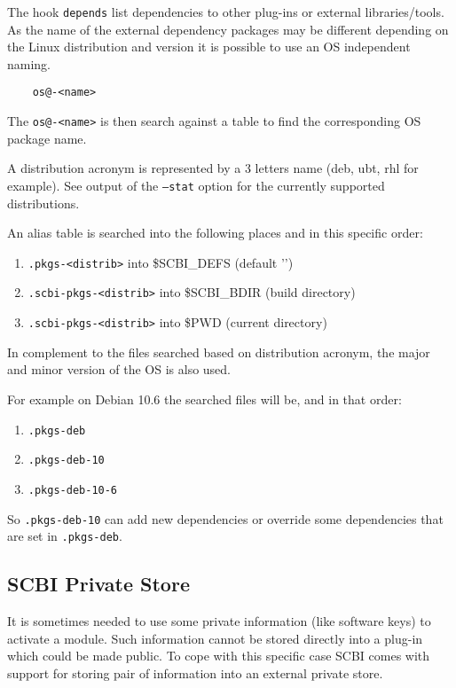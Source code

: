 \documentclass[a4paper,12pt,twoside]{article}
\newcommand{\code}[1]{\texttt{#1}}
\newcommand{\file}[1]{'{\path{#1}}'}
\begin{document}
The hook \code{depends} list dependencies to other plug-ins or external libraries/tools. As the name of the external dependency packages may be different depending on the Linux distribution and version it is possible to use an OS independent naming.

\begin{lstlisting}
	os@-<name>
\end{lstlisting}

The \code{os@-<name>} is then search against a table to find the corresponding OS package name.

A distribution acronym is represented by a 3 letters name (deb, ubt, rhl for example). See output of the \code{--stat} option for the currently supported distributions.

An alias table is searched into the following places and in this specific order:

\begin{enumerate}
	\item \code{.pkgs-<distrib>} into \$SCBI\_DEFS (default \file{~/.config/scbi})
	\item \code{.scbi-pkgs-<distrib>} into \$SCBI\_BDIR (build directory)
	\item \code{.scbi-pkgs-<distrib>} into \$PWD (current directory)
\end{enumerate}

In complement to the files searched based on distribution acronym, the major and minor version of the OS is also used.

For example on Debian 10.6 the searched files will be, and in that order:

\begin{enumerate}
	\item \code{.pkgs-deb}
	\item \code{.pkgs-deb-10}
	\item \code{.pkgs-deb-10-6}
\end{enumerate}

So \code{.pkgs-deb-10} can add new dependencies or override some dependencies that are set in \code{.pkgs-deb}.

\subsection{SCBI Private Store}
\label{private store}
\label{store}

It is sometimes needed to use some private information (like software keys) to activate a module. Such information cannot be stored directly into a plug-in which could be made public. To cope with this specific case SCBI comes with support for storing pair of information into an external private store.
\end{document}
